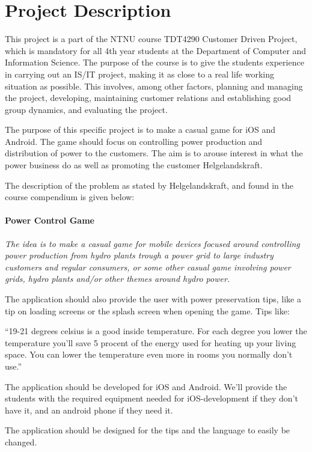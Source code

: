 \section{Project Description}

This project is a part of the NTNU course TDT4290 Customer Driven Project, which is mandatory for all 4th year students at the Department of Computer and Information Science. The purpose of the course is to give the students experience in carrying out an IS/IT project, making it as close to a real life working situation as possible. This involves, among other factors, planning and managing the project, developing, maintaining customer relations and establishing good group dynamics, and evaluating the project.

The purpose of this specific project is to make a casual game for iOS and Android. The game should focus on controlling power production and distribution of power to the customers. The aim is to arouse interest in what the power business do as well as promoting the customer Helgelandskraft.

The description of the problem as stated by Helgelandskraft, and found in the course compendium is given below: 
		\paragraph{Power Control Game}
		{\it The idea is to make a casual game for mobile devices focused around controlling 
		power production from hydro plants trough a power grid to large industry customers and 
		regular consumers, or some other casual game involving power grids, hydro plants 
		and/or other themes around hydro power. 
		 
		The application should also provide the user with power preservation tips, like a 
		tip on loading screens or the splash screen when opening the game. Tips like: 
		 
		“19-21 degrees celsius is a good inside temperature. For each degree you lower the temperature 
		you’ll save 5 procent of the energy used for heating up your living space. 
		You can lower the temperature even more in rooms you normally don’t use.” 
		 
		The application should be developed for iOS and Android. We’ll provide the 
		students with the required equipment needed for iOS-development if they don’t 
		have it, and an android phone if they need it. 
		 
		The application should be designed for the tips and the language to easily be changed.}

\clearpage